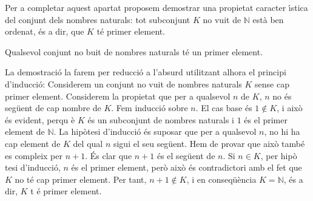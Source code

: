 \bigskip

Per a completar aquest apartat proposem demostrar una propietat caracter%
\'{\i}stica del conjunt dels nombres naturals: tot subconjunt $K$ no vuit de
$\mathbb{N}$ est\`{a} ben ordenat, \'{e}s a dir, que $K$ t\'{e} primer
element.

\begin{teorema}
Qualsevol conjunt no buit de nombres naturals t\'{e} un primer element.
\end{teorema}

\begin{prova}
La demostraci\'{o} la farem per reducci\'{o} a l'absurd utilitzant alhora el
principi d'inducci\'{o}: Considerem un conjunt no vuit de nombres naturals $K
$ sense cap primer element. Considerem la propietat que per a qualsevol $n$
de $K$, $n$ no \'{e}s seg\"{u}ent de cap nombre de $K$. Fem inducci\'{o}
sobre $n$. El cas base \'{e}s $1\notin K$, i aix\`{o} \'{e}s evident, perqu%
\`{e} $K$ \'{e}s un subconjunt de nombres naturals i $1$ \'{e}s el primer
element de $\mathbb{N}$. La hip\`{o}tesi d'inducci\'{o} \'{e}s suposar que
per a qualsevol $n$, no hi ha cap element de $K$ del qual $n$ sigui el seu
seg\"{u}ent. Hem de provar que aix\`{o} tamb\'{e} es compleix per $n+1$.
\'{E}s clar que $n+1$ \'{e}s el seg\"{u}ent de $n$. Si $n\in K$, per hip\`{o}%
tesi d'inducci\'{o}, $n$ \'{e}s el primer element, per\`{o} aix\`{o} \'{e}s
contradictori amb el fet que $K$ no t\'{e} cap primer element. Per tant, $%
n+1\notin K$, i en conseq\"{u}\`{e}ncia $K=\mathbb{N}$, \'{e}s a dir, $K$ t%
\'{e} primer element.
\end{prova}
